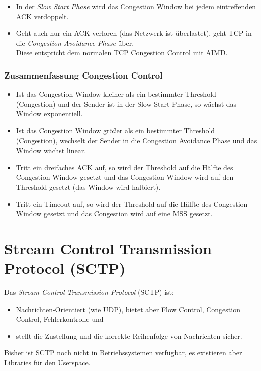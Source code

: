 				\begin{itemize}
					\item In der \textit{Slow Start Phase} wird das Congestion Window bei jedem eintreffenden ACK verdoppelt.
					\item Geht auch nur ein ACK verloren (das Netzwerk ist überlastet), geht TCP in die \textit{Congestion Avoidance Phase} über. \\ Diese entspricht dem normalen TCP Congestion Control mit AIMD.
				\end{itemize}

			\subsubsection{Zusammenfassung Congestion Control}
				\begin{itemize}
					\item Ist das Congestion Window kleiner als ein bestimmter Threshold (Congestion) und der Sender ist in der Slow Start Phase, so wächst das Window exponentiell.
					\item Ist das Congestion Window größer als ein bestimmter Threshold (Congestion), wechselt der Sender in die Congestion Avoidance Phase und das Window wächst linear.
					\item Tritt ein dreifaches ACK auf, so wird der Threshold auf die Hälfte des Congestion Window gesetzt und das Congestion Window wird auf den Threshold gesetzt (das Window wird halbiert).
					\item Tritt ein Timeout auf, so wird der Threshold auf die Hälfte des Congestion Window gesetzt und das Congestion wird auf eine MSS gesetzt.
				\end{itemize}

	\section{Stream Control Transmission Protocol (SCTP)}
		Das \textit{Stream Control Transmission Protocol} (SCTP) ist:
		\begin{itemize}
			\item Nachrichten-Orientiert (wie UDP), bietet aber Flow Control, Congestion Control, Fehlerkontrolle und
			\item stellt die Zustellung und die korrekte Reihenfolge von Nachrichten sicher.
		\end{itemize}

		Bisher ist SCTP noch nicht in Betriebssystemen verfügbar, es existieren aber Libraries für den Userspace.

